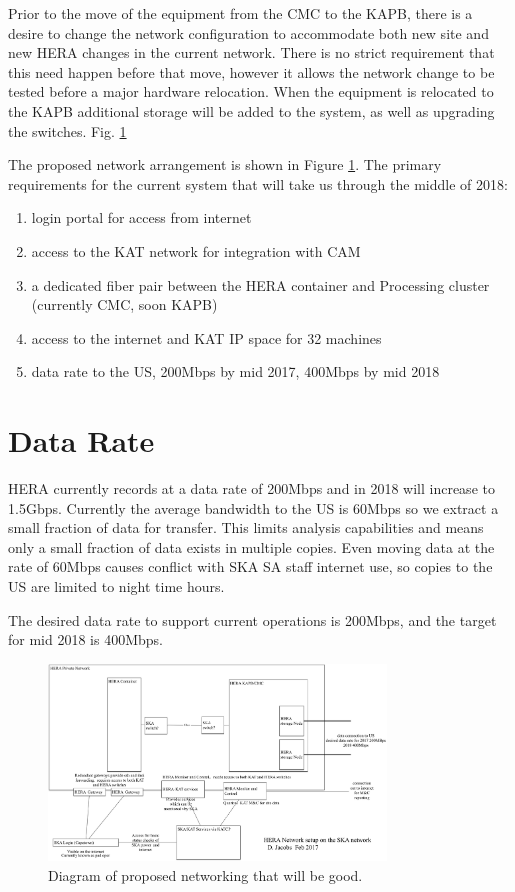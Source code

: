 \documentclass{article}
\begin{document}
Prior to the move of the equipment from the CMC to the KAPB, there is a desire to change the network configuration to accommodate both new site and new HERA changes in the current network.  There is no strict requirement that this need happen before that move, however it allows the network change to be tested before a major hardware relocation.  When the equipment is relocated to the KAPB additional storage will be added to the system, as well as upgrading the switches.  Fig. \ref{fig:net_org} 

The proposed network arrangement is shown in Figure \ref{fig:net_org}.  The primary requirements for the current system that will take us through the middle of 2018:
\begin{enumerate}
\item login portal for access from internet
\item access to the KAT network for integration with CAM
\item a dedicated fiber pair between the HERA container and Processing cluster (currently CMC, soon KAPB)
\item access to the internet and KAT IP space for 32 machines
\item data rate to the US, 200Mbps by mid 2017, 400Mbps by mid 2018
\end{enumerate}

\section{Data Rate}
HERA currently records at a data rate of 200Mbps and in 2018 will increase to 1.5Gbps. Currently the average bandwidth to the US is 60Mbps so we extract a small fraction of data for transfer. This limits analysis capabilities and means only a small fraction of data exists in multiple copies.  Even moving data at the rate of 60Mbps causes conflict with SKA SA staff internet use, so copies to the US are limited to night time hours.  

The desired data rate to support current operations is 200Mbps, and the target for mid 2018 is 400Mbps.

\begin{figure}[H]
\includegraphics[width=0.8\textwidth]{HERA_2017_network_organization.png}
\centering
\caption{Diagram of proposed networking that will be good.}
\label{fig:net_org}
\end{figure}
\end{document}
